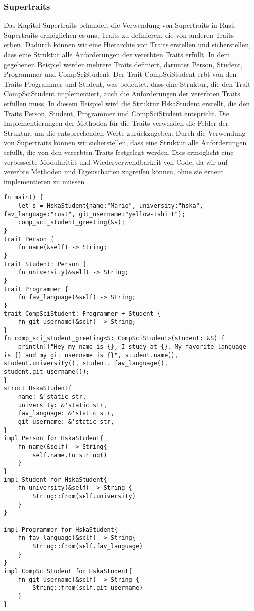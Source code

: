 \documentclass[a4paper, 1ppt]{article}
\begin{document}
\subsubsection{Supertraits}
Das Kapitel Supertraits behandelt die Verwendung von Supertraits in Rust. Supertraits ermöglichen es uns, Traits zu definieren, die von anderen Traits erben. Dadurch können wir eine Hierarchie von Traits erstellen und sicherstellen, dass eine Struktur alle Anforderungen der vererbten Traits erfüllt.
In dem gegebenen Beispiel werden mehrere Traits definiert, darunter Person, Student, Programmer und CompSciStudent. Der Trait CompSciStudent erbt von den Traits Programmer und Student, was bedeutet, dass eine Struktur, die den Trait CompSciStudent implementiert, auch die Anforderungen der vererbten Traits erfüllen muss.
In diesem Beispiel wird die Struktur HskaStudent erstellt, die den Traits Person, Student, Programmer und CompSciStudent entspricht. Die Implementierungen der Methoden für die Traits verwenden die Felder der Struktur, um die entsprechenden Werte zurückzugeben.
Durch die Verwendung von Supertraits können wir sicherstellen, dass eine Struktur alle Anforderungen erfüllt, die von den vererbten Traits festgelegt werden. Dies ermöglicht eine verbesserte Modularität und Wiederverwendbarkeit von Code, da wir auf vererbte Methoden und Eigenschaften zugreifen können, ohne sie erneut implementieren zu müssen.
\begin{verbatim}
fn main() {
    let s = HskaStudent{name:"Mario", university:"hska", fav_language:"rust", git_username:"yellow-tshirt"};
    comp_sci_student_greeting(&s);
}
trait Person {
    fn name(&self) -> String;
}
trait Student: Person {
    fn university(&self) -> String;
}
trait Programmer {
    fn fav_language(&self) -> String;
}
trait CompSciStudent: Programmer + Student {
    fn git_username(&self) -> String;
}
fn comp_sci_student_greeting<S: CompSciStudent>(student: &S) {
    println!("Hey my name is {}, I study at {}. My favorite language is {} and my git username is {}", student.name(), student.university(), student. fav_language(), student.git_username());
}
struct HskaStudent{
    name: &'static str,
    university: &'static str,
    fav_language: &'static str,
    git_username: &'static str,
}
impl Person for HskaStudent{
    fn name(&self) -> String{
        self.name.to_string()
    }
}
impl Student for HskaStudent{
    fn university(&self) -> String {
        String::from(self.university)
    }
}

impl Programmer for HskaStudent{
    fn fav_language(&self) -> String{
        String::from(self.fav_language)
    }
}
impl CompSciStudent for HskaStudent{
    fn git_username(&self) -> String {
        String::from(self.git_username)
    }
}
\end{verbatim}
\end{document}
